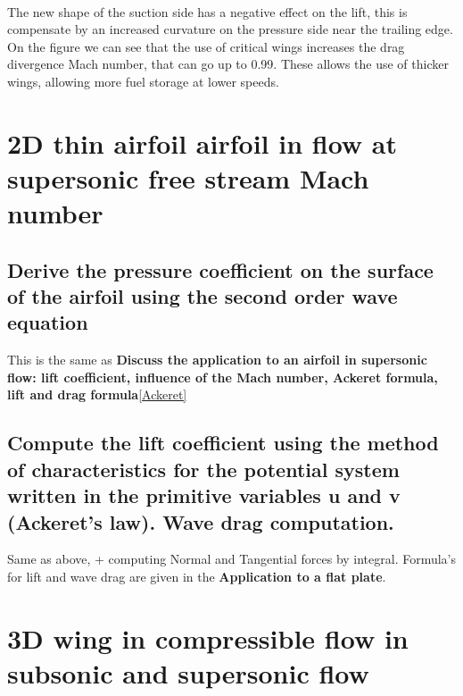 \documentclass[british,french,11pt, a4paper, openany]{article}
\begin{document}
\ \\ The new shape of the suction side has a negative effect on the lift, this is compensate by an increased curvature on the pressure side near the trailing edge. On the figure we can see that the use of critical wings increases the drag divergence Mach number, that can go up to 0.99. These allows the use of thicker wings, allowing more fuel storage at lower speeds. 


\section{2D thin airfoil airfoil in flow at supersonic free stream Mach number}
\subsection{Derive the pressure coefficient on the surface of the airfoil using the second	order wave equation}
This is the same as \og\textbf{Discuss the application to an airfoil in supersonic flow: lift coefficient, influence of the Mach number, Ackeret formula, lift and drag formula}\fg\ref{Ackeret}

\subsection{Compute the lift coefficient using the method of characteristics for the	potential system written in the primitive variables u and v (Ackeret’s law). Wave drag computation.}
Same as above, + computing Normal and Tangential forces by integral. Formula's for lift and wave drag are given in the \textbf{Application to a flat plate}.




\section{3D wing in compressible flow in subsonic and supersonic flow}
\end{document}
